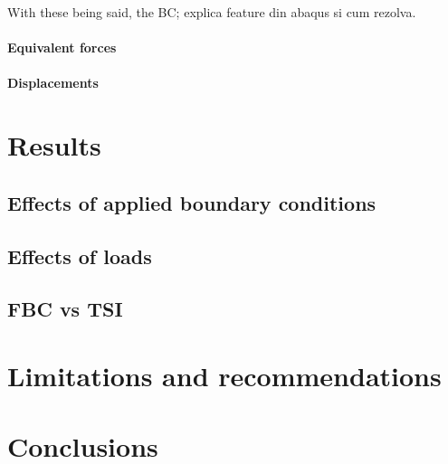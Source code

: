 \documentclass[10pt,a4paper]{report}
\begin{document}
	With these being said, the 
	BC; explica feature din abaqus si cum rezolva.
	\paragraph{Equivalent forces}
	\paragraph{Displacements}
	 

\section{Results}
\subsection{Effects of applied boundary conditions}
\subsection{Effects of loads}
\subsection{FBC vs TSI}

\section{Limitations and recommendations}
\section{Conclusions}
	 
	
\end{document}
